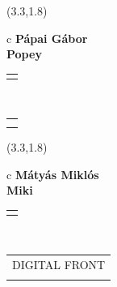 \documentclass[11pt]{article}
\begin{document}
\makebox(3.3,1.8){
  \renewcommand\arraystretch{1.3}
  \begin{tabular}[c]{c}
    \hspace{8.5mm}
    \LARGE\bf{ Pápai Gábor }\\
    \hspace{8.5mm}
    \Large{ Popey }\\
    \renewcommand\arraystretch{3}
    \begin{tabular}[c]{c}
      \centering
      \fontfamily{phv}\selectfont{
        \textbf{
          \textsc{
            \scriptsize{
            \color{Dark}{ Ismerkedő }\color{Bright}{ Webmester }\color{Bright}{ Sminkmester }\color{Bright}{ Programozó }
            }
          }
        }
      }
    \end{tabular}
    \\
    \renewcommand\arraystretch{1}
    \begin{tabular}{p{3.3in}}
      \hspace{.7cm}\\
      \hspace{.7cm}\emph{ }\\
    \end{tabular}
  \end{tabular}
}

\makebox(3.3,1.8){
  \renewcommand\arraystretch{1.3}
  \begin{tabular}[c]{c}
    \hspace{8.5mm}
    \LARGE\bf{ Mátyás Miklós }\\
    \hspace{8.5mm}
    \Large{ Miki }\\
    \renewcommand\arraystretch{3}
    \begin{tabular}[c]{c}
      \centering
      \fontfamily{phv}\selectfont{
        \textbf{
          \textsc{
            \scriptsize{
            \color{Bright}{ Ismerkedő }\color{Dark}{ Webmester }\color{Bright}{ Sminkmester }\color{Bright}{ Programozó }
            }
          }
        }
      }
    \end{tabular}
    \\
    \renewcommand\arraystretch{1}
    \begin{tabular}{p{3.3in}}
      \hspace{.7cm}DIGITAL FRONT\\
      \hspace{.7cm}\emph{  }\\
    \end{tabular}
  \end{tabular}
}
\end{document}
